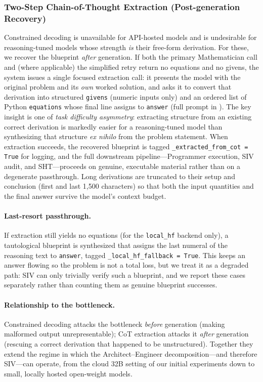 \documentclass[11pt,a4paper]{article}
\begin{document}
\subsubsection{Two-Step Chain-of-Thought Extraction (Post-generation Recovery)}
Constrained decoding is unavailable for API-hosted models and is undesirable for reasoning-tuned models whose strength \emph{is} their free-form derivation.
For these, we recover the blueprint \emph{after} generation.
If both the primary Mathematician call and (where applicable) the simplified retry return no equations and no givens, the system issues a single focused extraction call: it presents the model with the original problem and its \emph{own} worked solution, and asks it to convert that derivation into structured \texttt{givens} (numeric inputs only) and an ordered list of Python \texttt{equations} whose final line assigns to \texttt{answer} (full prompt in ).
The key insight is one of \emph{task difficulty asymmetry}: extracting structure from an existing correct derivation is markedly easier for a reasoning-tuned model than synthesizing that structure \emph{ex nihilo} from the problem statement.
When extraction succeeds, the recovered blueprint is tagged \texttt{\_extracted\_from\_cot = True} for logging, and the full downstream pipeline---Programmer execution, SIV audit, and SHT---proceeds on genuine, executable material rather than on a degenerate passthrough.
Long derivations are truncated to their setup and conclusion (first and last 1{,}500 characters) so that both the input quantities and the final answer survive the model's context budget.

\paragraph{Last-resort passthrough.}
If extraction still yields no equations (for the \texttt{local\_hf} backend only), a tautological blueprint is synthesized that assigns the last numeral of the reasoning text to \texttt{answer}, tagged \texttt{\_local\_hf\_fallback = True}.
This keeps an answer flowing so the problem is not a total loss, but we treat it as a degraded path: SIV can only trivially verify such a blueprint, and we report these cases separately rather than counting them as genuine blueprint successes.

\paragraph{Relationship to the bottleneck.}
Constrained decoding attacks the bottleneck \emph{before} generation (making malformed output unrepresentable); CoT extraction attacks it \emph{after} generation (rescuing a correct derivation that happened to be unstructured).
Together they extend the regime in which the Architect--Engineer decomposition---and therefore SIV---can operate, from the cloud 32B setting of our initial experiments down to small, locally hosted open-weight models.
\end{document}
